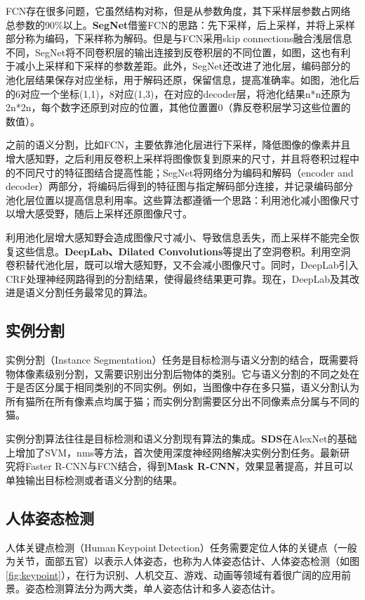 FCN存在很多问题，它虽然结构对称，但是从参数角度，其下采样层参数占网络总参数的90\%以上。\textbf{SegNet}借鉴FCN的思路：先下采样，后上采样，并将上采样部分称为编码，下采样称为解码。但是与FCN采用skip connections融合浅层信息不同，SegNet将不同卷积层的输出连接到反卷积层的不同位置，如图，这也有利于减小上采样和下采样的参数差距。此外，SegNet还改进了池化层，编码部分的池化层结果保存对应坐标，用于解码还原，保留信息，提高准确率。如图，池化后的6对应一个坐标(1,1)，8对应(1,3)，在对应的decoder层，将池化结果n*n还原为2n*2n，每个数字还原到对应的位置，其他位置置0（靠反卷积层学习这些位置的数值）。

之前的语义分割，比如FCN，主要依靠池化层进行下采样，降低图像的像素并且增大感知野，之后利用反卷积上采样将图像恢复到原来的尺寸，并且将卷积过程中的不同尺寸的特征图结合提高性能；SegNet将网络分为编码和解码（encoder and decoder）两部分，将编码后得到的特征图与指定解码部分连接，并记录编码部分池化层位置以提高信息利用率。这些算法都遵循一个思路：利用池化减小图像尺寸以增大感受野，随后上采样还原图像尺寸。

利用池化层增大感知野会造成图像尺寸减小、导致信息丢失，而上采样不能完全恢复这些信息。\textbf{DeepLab、Dilated Convolutions}\cite{yu2015multi,chen2018deeplab}等提出了空洞卷积。利用空洞卷积替代池化层，既可以增大感知野，又不会减小图像尺寸。同时，DeepLab引入CRF处理神经网路得到的分割结果，使得最终结果更可靠。现在，DeepLab及其改进是语义分割任务最常见的算法。

\subsection{实例分割}
实例分割（Instance Segmentation）任务是目标检测与语义分割的结合，既需要将物体像素级别分割，又需要识别出分割后物体的类别。它与语义分割的不同之处在于是否区分属于相同类别的不同实例。例如，当图像中存在多只猫，语义分割认为所有猫所在所有像素点均属于猫；而实例分割需要区分出不同像素点分属与不同的猫。

实例分割算法往往是目标检测和语义分割现有算法的集成。\textbf{SDS}\cite{de2017semantic}在AlexNet的基础上增加了SVM，nms等方法，首次使用深度神经网络解决实例分割任务。最新研究将Faster R-CNN与FCN结合，得到\textbf{Mask R-CNN}\cite{he2017mask}，效果显著提高，并且可以单独输出目标检测或者语义分割的结果。

\subsection{人体姿态检测}
人体关键点检测（Human\,Keypoint\,Detection）任务需要定位人体的关键点（一般为关节，面部五官）以表示人体姿态，也称为人体姿态估计、人体姿态检测（如图\ref{fig:keypoint}），在行为识别、人机交互、游戏、动画等领域有着很广阔的应用前景。姿态检测算法分为两大类，单人姿态估计和多人姿态估计。

